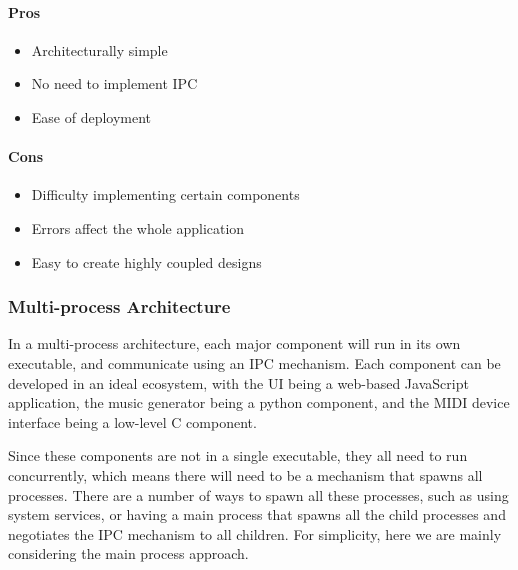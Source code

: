 \paragraph{Pros}

\begin{itemize}
  \item Architecturally simple
  \item No need to implement IPC
  \item Ease of deployment
\end{itemize}

\paragraph{Cons}

\begin{itemize}
  \item Difficulty implementing certain components
  \item Errors affect the whole application
  \item Easy to create highly coupled designs
\end{itemize}

\subsubsection{Multi-process Architecture}

In a multi-process architecture, each major component will run in its own executable, and
communicate using an IPC mechanism. Each component can be developed in an ideal ecosystem,
with the UI being a web-based JavaScript application, the music generator being a python
component, and the MIDI device interface being a low-level C component.

Since these components are not in a single executable, they all need to run concurrently,
which means there will need to be a mechanism that spawns all processes. There are a
number of ways to spawn all these processes, such as using system services, or having a
main process that spawns all the child processes and negotiates the IPC mechanism to all
children. For simplicity, here we are mainly considering the main process approach.

